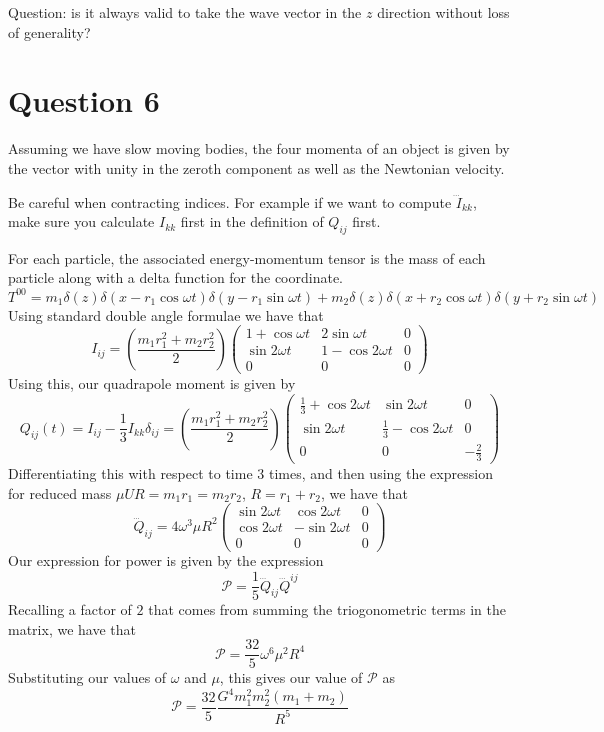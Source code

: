 Question: is it always valid to 
take the wave vector in the $ z $ direction without loss 
of generality? 


\pagebreak
\section{Question 6}
Assuming we have slow moving bodies, 
the four momenta of an object is given by 
the vector with unity in the zeroth component 
as well as the Newtonian velocity. 

Be careful 
when contracting indices. For example 
if we want to compute $ \dddot{ I }_{ kk }  $, 
make sure you calculate $  I _{ kk} $ first in 
the definition of $ Q _{ ij } $ first. 

For each particle, the associated energy-momentum 
tensor is the mass of each particle along with 
a delta function for the coordinate.
\[
	T^{ 00 }  = m_1 \delta \left( z \right)  \delta \left( x -r_1 \cos \omega t  \right) \delta\left( y  - r_1 \sin \omega t  \right)  + m_2 \delta\left( z  \right)  \delta \left( x + r_2 \cos \omega t  \right)  \delta\left( y + r_2 \sin \omega t  \right)  
\] Using standard double angle formulae we have
that 
\[
	I_{ ij }  = \left( \frac{ m_1 r_1 ^ 2 + m_2 r_2^ 2 }{ 2 }  \right)  
	\begin{pmatrix} 1 + \cos \omega t &  2 \sin \omega t & 0 \\
	\sin 2 \omega t & 1 - \cos 2 \omega t & 0 \\ 
0 & 0 & 0 \end{pmatrix}  
\] Using this, our quadrapole moment is given by 
\[
	Q_{ ij} \left( t  \right)  = I_{ ij }  - \frac{1}{3 } I_{ kk } \delta_{ ij } 
	 =  \left( \frac{ m_1 r_1 ^ 2 + m_2 r_2^ 2 }{ 2 }  \right)  
	 \begin{pmatrix}  \frac{1}{3 } + \cos 2 \omega t  & \sin 2 \omega t & 0 \\ 
	 \sin 2 \omega t & \frac{1}{3 } - \cos 2 \omega t & 0 \\
         0 & 0 &  - \frac{2}{3 } \end{pmatrix}   
\] Differentiating this with respect to time 3 times, 
and then using the expression for reduced mass $ \mu U R  = m_1 r_1 = m_2 r_2 $, $ R  = r_1 + r_2 $, we have that 
\[
	 \dddot{Q}_{ ij } = 
	 4 \omega ^ 3 \mu R ^ 2   \begin{pmatrix} \sin 2 \omega t & \cos 2 \omega t & 0 \\ \cos 2 \omega t &  - \sin 2 \omega t & 0 \\ 
	 0 & 0 & 0 \end{pmatrix} 
\] Our expression for power 
is given by the expression 
\[
 \mathcal{ P }  = \frac{1}{5 } 
 \dddot{ Q}_{ ij  } \dddot{ Q } ^{ ij }
\] Recalling a factor of $ 2 $ that 
comes from summing the triogonometric 
terms in the matrix, we have that 
\[
 \mathcal{ P }  = \frac{32}{ 5 } \omega^  6 \mu ^ 2 R ^ 4 
\] Substituting our values of $ \omega $ and $ \mu $, this gives our value of $ \mathcal{ P } $ as 
\[
 \mathcal{ P }  = \frac{32}{5 } \frac{ G ^ 4 
 m_1 ^ 2 m_2 ^ 2 \left( m_1 + m_2  \right)  }{ R ^ 5 }
\] 

